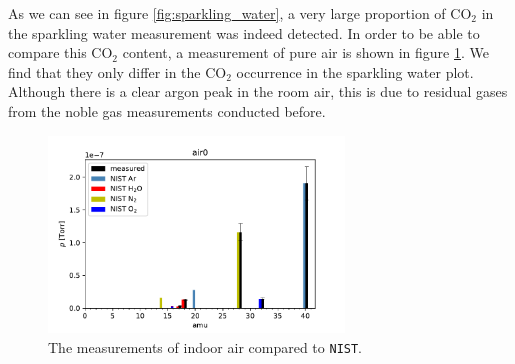     As we can see in figure \ref{fig:sparkling_water}, a very large proportion of CO$_2$ in the sparkling water measurement was indeed detected. In order to be able to compare this CO$_2$ content, a measurement of pure air is shown in figure \ref{fig:air0}. We find that they only differ in the CO$_2$ occurrence in the sparkling water plot. Although there is a clear argon peak in the room air, this is due to residual gases from the noble gas measurements conducted before. 
    
    \begin{figure}[h!]
    \centering
    \includegraphics[width=0.7\textwidth]{Report/DataResultsPlots/air0.pdf}
    \caption{The measurements of indoor air compared to \texttt{NIST}.}
    \label{fig:air0}
    \end{figure}
    
